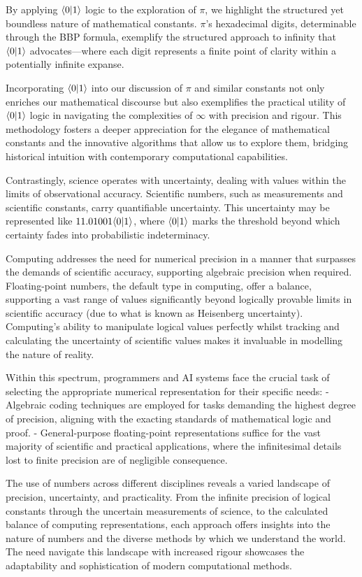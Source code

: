 \documentclass[12pt]{article}
\begin{document}
By applying \(\langle 0 | 1 \rangle\) logic to the exploration of \(\pi\), we highlight the structured yet boundless nature of mathematical constants. \(\pi\)'s hexadecimal digits, determinable through the BBP formula, exemplify the structured approach to infinity that \(\langle 0 | 1 \rangle\) advocates—where each digit represents a finite point of clarity within a potentially infinite expanse.

Incorporating \(\langle 0 | 1 \rangle\) into our discussion of \(\pi\) and similar constants not only enriches our mathematical discourse but also exemplifies the practical utility of \(\langle 0 | 1 \rangle\) logic in navigating the complexities of \(\infty\) with precision and rigour. This methodology fosters a deeper appreciation for the elegance of mathematical constants and the innovative algorithms that allow us to explore them, bridging historical intuition with contemporary computational capabilities.

Contrastingly, science operates with uncertainty, dealing with values within the limits of observational accuracy. Scientific numbers, such as measurements and scientific constants, carry quantifiable uncertainty. This uncertainty may be represented like \(11.01001\langle 0 | 1 \rangle\), where \(\langle 0 | 1 \rangle\) marks the threshold beyond which certainty fades into probabilistic indeterminacy.

Computing addresses the need for numerical precision in a manner that surpasses the demands of scientific accuracy, supporting algebraic precision when required. Floating-point numbers, the default type in computing, offer a balance, supporting a vast range of values significantly beyond logically provable limits in scientific accuracy (due to what is known as Heisenberg uncertainty). Computing's ability to manipulate logical values perfectly whilst tracking and calculating the uncertainty of scientific values makes it invaluable in modelling the nature of reality.

Within this spectrum, programmers and AI systems face the crucial task of selecting the appropriate numerical representation for their specific needs:
- Algebraic coding techniques are employed for tasks demanding the highest degree of precision, aligning with the exacting standards of mathematical logic and proof.
- General-purpose floating-point representations suffice for the vast majority of scientific and practical applications, where the infinitesimal details lost to finite precision are of negligible consequence.

The use of numbers across different disciplines reveals a varied landscape of precision, uncertainty, and practicality. From the infinite precision of logical constants through the uncertain measurements of science, to the calculated balance of computing representations, each approach offers insights into the nature of numbers and the diverse methods by which we understand the world. The need navigate this landscape with increased rigour showcases the adaptability and sophistication of modern computational methods.
\end{document}
